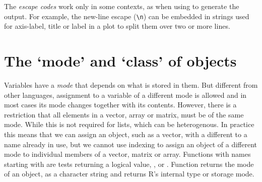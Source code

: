 \documentclass[krantz2]{krantz}\usepackage{knitr}
\begin{document}
The \textit{escape codes} work only in some contexts, as when using  to generate the output. For example, the new-line escape (\verb|\n|) can be embedded in strings used for axis-label, title or label in a plot to split them over two or more lines.

\section{The `mode' and `class' of objects}\label{sec:rlang:mode}
Variables have a \emph{mode} that depends on what is stored in them. But different from other languages, assignment to a variable of a different mode is allowed and in most cases its mode changes together with its contents. However, there is a restriction that all elements in a vector, array or matrix, must be of the same mode. While this is not required for lists, which can be heterogenous. In practice this means that we can assign an object, such as a vector, with a different  to a name already in use, but we cannot use indexing to assign an object of a different mode to individual members of a vector, matrix or array. Functions with names starting with  are tests returning a logical value, ,  or . Function  returns the mode of an object, as a character string and  returns R's internal type or storage mode.
\end{document}
